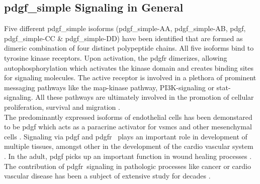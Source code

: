     \subsection{\ac{pdgf_simple} Signaling in General}
    \label{subsec:pdgf_the_cytokine}
    Five different \ac{pdgf_simple} isoforms (\ac{pdgf_simple}-AA, \ac{pdgf_simple}-AB, \ac{pdgf}, \ac{pdgf_simple}-CC \& \ac{pdgf_simple}-DD) have been identified that are formed as dimeric combination of four distinct polypeptide chains. All five isoforms bind to tyrosine kinase receptors. Upon activation, the \ac{pdgfr} dimerizes, allowing autophosphorylation which activates the kinase domain and creates binding sites for signaling molecules. The active receptor is involved in a plethora of prominent messaging pathways like the \ac{map}-kinase pathway, \ac{PI3K}-signaling or \ac{stat}-signaling. All these pathways are ultimately involved in the promotion of cellular proliferation, survival and migration \cite{chenPlateletderivedGrowthFactors2013, heldinTargetingPDGFSignaling2013, huTargetingPlateletderivedGrowth2015}.\\
    The predominantly expressed isoforms of endothelial cells has been demonstared to be \ac{pdgf} \cite{andraeRolePlateletderivedGrowth2008, heldinTargetingPDGFSignaling2013} which acts as a paracrine activator for \acp{vsmc} and other mesenchymal cells \cite{heldinTargetingPDGFSignaling2013}. Signaling via \ac{pdgf} and \ac{pdgfr}\beta~ plays an important role in development of multiple tissues, amongst other in the development of the cardio vascular system \cite{leveenMiceDeficientPDGF1994}. In the adult, \ac{pdgf} picks up an important function in wound healing processes \cite{robsonPlateletderivedGrowthFactor1992}. The contribution of \ac{pdgfr}\beta~signaling in pathologic processes like cancer or cardio vascular disease has been a subject of extensive study for decades \cite{heldinTargetingPDGFSignaling2013, rainesPDGFCardiovascularDisease2004}.

